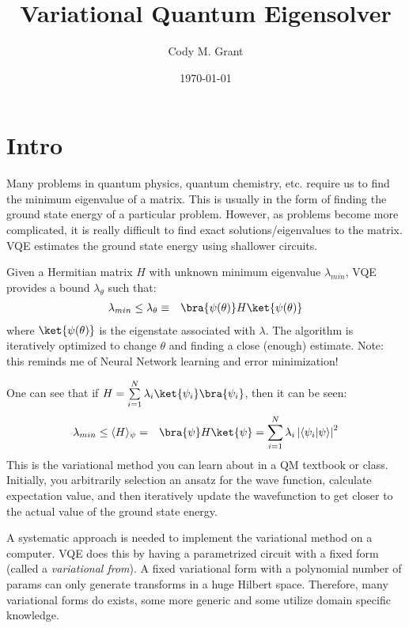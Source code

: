 \documentclass[preprint,aps,prd,nofootinbib,superscriptaddress]{revtex4-2}
\newcommand{\BraKet}[2]{\langle #1 | #2 \rangle}
\begin{document}
\title{\boldmath Variational Quantum Eigensolver}


\author{Cody M. Grant}


\date{\today}

%
\maketitle
\newpage

\section{Intro}
%
Many problems in quantum physics, quantum chemistry, etc. require us to find the minimum eigenvalue of a matrix. This is usually in the form of finding the ground state energy of a particular problem. However, as problems become more complicated, it is really difficult to find exact solutions/eigenvalues to the matrix. VQE estimates the ground state energy using shallower circuits. 
%

%
Given a Hermitian matrix $H$ with unknown minimum eigenvalue $\lambda_{min}$, VQE provides a bound $\lambda_{\theta}$ such that:
%
\begin{eqnarray}
\lambda_{min} \leq \lambda_{\theta} &\equiv & \bra{\psi(\theta)} H \ket{\psi(\theta)}
\end{eqnarray}
%
where $\ket{\psi(\theta)}$ is the eigenstate associated with $\lambda$. The algorithm is iteratively optimized to change $\theta$ and finding a close (enough) estimate. Note: this reminds me of Neural Network learning and error minimization!
%

%
One can see that if $H = \sum \limits _{i=1} ^{N} \lambda_i \ket{\psi_i} \bra{\psi_i}$, then it can be seen:
%
\begin{eqnarray}
\lambda_{min} \leq \langle H \rangle_\psi &=& \bra{\psi} H \ket{\psi} = \sum \limits _{i=1} ^{N} \lambda_i \left|\BraKet{\psi_i}{\psi} \right|^2
\end{eqnarray}
%
This is the variational method you can learn about in a QM textbook or class. Initially, you arbitrarily selection an ansatz for the wave function, calculate expectation value, and then iteratively update the wavefunction to get closer to the actual value of the ground state energy.
%

%
A systematic approach is needed to implement the variational method on a computer. VQE does this by having a parametrized circuit with a fixed form (called a \textit{variational from}). A fixed variational form with a polynomial number of params can only generate transforms in a huge Hilbert space. Therefore, many variational forms do exists, some more generic and some utilize domain specific knowledge.
%
\end{document}

